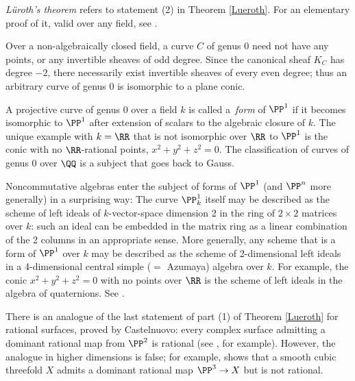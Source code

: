 \begin{fact}
\emph{L\"uroth's theorem} refers to statement (2) in Theorem \ref{Lueroth}.
%
For an elementary proof of it, valid over any
field, see
\cite[Section 8.13]{JacobsonII}.

Over a non-algebraically closed field, a curve $C$ of genus 0 need not
have any points, or any invertible sheaves of odd degree. Since the
canonical sheaf $K_C$ has degree $-2$, there necessarily exist
invertible sheaves of every even degree; thus an arbitrary curve of
%
genus 0 is isomorphic to a  plane conic.

A projective curve of genus 0 over a field $k$ is called a
\,\emph{form}
%
of $\PP^1$ if it becomes isomorphic to $\PP^1$ after extension
of scalars to
the algebraic closure of $k$. The unique example with $k = \RR$ that
is not isomorphic over $\RR$ to $\PP^1$
is the conic with no $\RR$-rational points, $x^2+y^2+z^2 = 0$.
%
The classification of curves of genus 0 over $\QQ$ is a subject that goes back to Gauss.



Noncommutative algebras enter the subject of forms of $\PP^1$ (and
$\PP^n$ more generally) in a surprising way: The curve $\PP_k^1$
itself may be described as the scheme of
%
left ideals of $k$-vector-space dimension 2 in the ring of
$2\times 2$ matrices over $k$: such an ideal can be embedded in the
matrix ring as a linear combination of the 2 columns in an appropriate sense.
More generally, any scheme that is a form of $\PP^1$ over $k$
may be described as the scheme of 2-dimensional left ideals in a
4-dimensional central simple ($=$
Azumaya) algebra
%
over $k$. For example, the
conic $x^2+y^2+z^2 = 0$ with no points over $\RR$ is the scheme of
left ideals in the algebra of
quaternions.
%
See \cite[Section X.6]{Serre1979}.

 There is an analogue
of the last statement of part (1) of Theorem \ref{Lueroth}
for rational surfaces,
proved
by
%
Castelnuovo: every complex surface admitting a dominant rational
map from $\PP^2$ is rational (see \cite[Corollary V.5]{Beauville}, for
example).
However, the analogue in higher
dimensions
is false; for example, \cite{MR0302652} shows that a smooth cubic threefold $X$ admits a dominant rational map $\PP^3 \to X$ but is not rational.
\end{fact}

